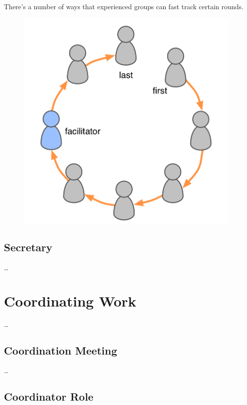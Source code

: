 There's a number of ways that experienced groups can fast track certain rounds.

\begin{figure}[htbp]
\centering
\includegraphics[keepaspectratio,width=\textwidth,height=0.75\textheight]{img/circle/rounds.png}
\end{figure}

\section{Secretary}
\label{secretary}

{\ldots}

\chapter{Coordinating Work}
\label{coordinatingwork}

{\ldots}

\section{Coordination Meeting}
\label{coordinationmeeting}

{\ldots}

\section{Coordinator Role}
\label{coordinatorrole}

